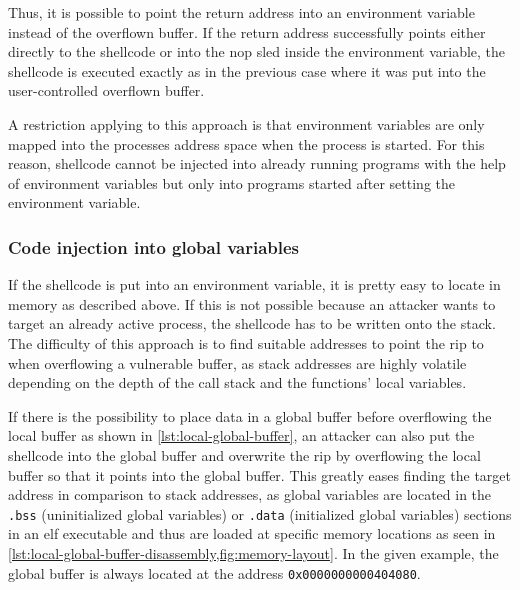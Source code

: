 Thus, it is possible to point the return address into an environment variable instead of the overflown buffer.
If the return address successfully points either directly to the shellcode or into the \acs{nop} sled inside the environment variable, the shellcode is executed exactly as in the previous case where it was put into the user-controlled overflown buffer.

A restriction applying to this approach is that environment variables are only mapped into the processes address space when the process is started.
For this reason, shellcode cannot be injected into already running programs with the help of environment variables but only into programs started after setting the environment variable.

\subsubsection{Code injection into global variables}
\label{subsubsec:ci-via-globals}

If the shellcode is put into an environment variable, it is pretty easy to locate in memory as described above.
If this is not possible because an attacker wants to target an already active process, the shellcode has to be written onto the stack.
The difficulty of this approach is to find suitable addresses to point the \gls{rip} to when overflowing a vulnerable buffer, as stack addresses are highly volatile depending on the depth of the call stack and the functions' local variables.

If there is the possibility to place data in a global buffer before overflowing the local buffer as shown in \cref{lst:local-global-buffer}, an attacker can also put the shellcode into the global buffer and overwrite the \gls{rip} by overflowing the local buffer so that it points into the global buffer.
This greatly eases finding the target address in comparison to stack addresses, as global variables are located in the \texttt{.bss} (uninitialized global variables) or \texttt{.data} (initialized global variables) sections in an \gls{elf} executable and thus are loaded at specific memory locations as seen in \cref{lst:local-global-buffer-disassembly,fig:memory-layout}.
In the given example, the global buffer is always located at the address \texttt{0x0000000000404080}.



